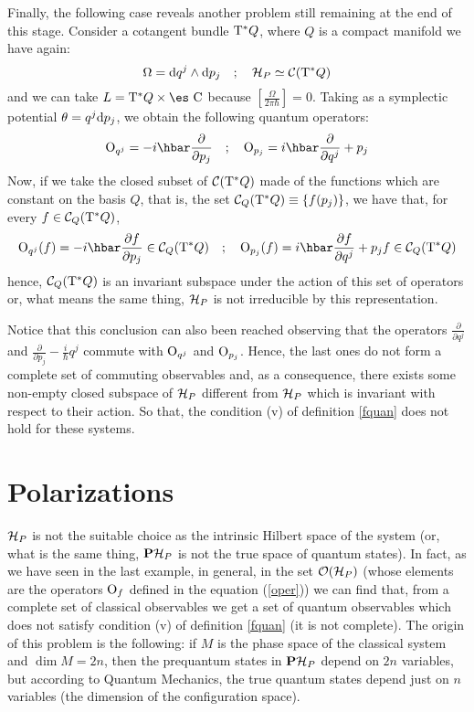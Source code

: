 \documentclass[12pt]{article}
\theoremstyle{plain}
\def\dst{\(}
\def\derpar#1#2{\frac{\partial{#1}}{\partial{#2}}}
\def\d{{\rm d}}
\def\C{{\cal C}}
\def\H{{\cal H}}
\def\Op{{\rm O}}
\def\Complex{\mbox{\es C}}
\def\Tan{{\rm T}}
\begin{document}
Finally, the following case reveals another problem
still remaining at the end of this stage.
Consider a cotangent bundle $\Tan^*Q$,
where $Q$ is a compact manifold we have again:
$$
\Omega = \d q^j \wedge \d p_j
\quad ; \quad
\H_P \simeq \C (\Tan^*Q)
$$
and we can take $L = \Tan^*Q \times \Complex$
because $[\frac{\Omega}{2\pi\hbar}] = 0$. Taking as a symplectic
potential
$\theta = q^j \d p_j$, we obtain the following quantum operators:
$$
\Op_{q^j} = -i\hbar \derpar{}{p_j}
\quad ; \quad
\Op_{p_j} = i\hbar \derpar{}{q^j} + p_j
$$
Now, if we take the closed subset of $\C (\Tan^*Q)$
made of the functions which are constant on the basis $Q$,
that is, the set $\C_Q(\Tan^*Q) \equiv \{ f(p_j) \}$,
we have that, for every $f \in \C_Q(\Tan^*Q)$,
$$
\Op_{q^j}(f) = -i\hbar \derpar{f}{p_j} \in \C_Q(\Tan^*Q)
\quad ; \quad
\Op_{p_j}(f) = i\hbar \derpar{f}{q^j} + p_jf  \in \C_Q(\Tan^*Q)
$$
hence, $\C_Q(\Tan^*Q)$
is an invariant subspace under the action
of this set of operators or, what means the same thing,
$\H_P$ is not irreducible by this representation.

Notice that this conclusion can also been reached
observing that the operators
\dst\derpar{}{q^j}\) and \dst\derpar{}{p_j}-\frac{i}{\hbar}q^j\)
commute with $\Op_{q^j}$ and $\Op_{p_j}$.
Hence, the last ones do not form a
complete set of commuting observables and,
as a consequence, there exists some non-empty closed subspace
of $\H_P$ different from $\H_P$ which is invariant with respect to their
action.
So that, the condition (v) of definition \ref{fquan} does not hold for
these systems.



\section{Polarizations}
\protect \label{gqpol}


$\H_P$ is not the suitable choice as the intrinsic Hilbert space
of the system (or, what is the same thing, ${\bf P}\H_P$ is not
the true space of quantum states). In fact, as we have seen in the
last example, in general, in the set ${\cal O}(\H_P)$ (whose
elements are the operators $\Op_f$ defined in the equation
(\ref{oper})) we can find that, from a complete set of classical
observables we get a set of quantum observables which does not
satisfy condition (v) of definition \ref{fquan} (it is not
complete). The origin of this problem is the following: if $M$ is
the phase space of the classical system and $\dim M =2n$, then the
prequantum states in ${\bf P}\H_P$ depend on $2n$ variables, but
according to Quantum Mechanics, the true quantum states depend
just on $n$ variables (the dimension of the configuration space).
\end{document}

